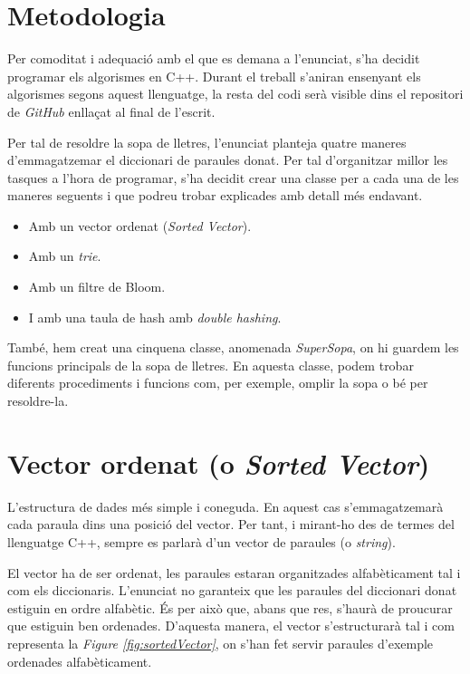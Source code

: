 \documentclass[titlepage]{article}
\begin{document}
\section{Metodologia}
Per comoditat i adequació amb el  que es demana a l'enunciat, s'ha decidit programar els algorismes en C++. Durant el treball s'aniran ensenyant els algorismes segons aquest llenguatge, la resta del codi serà visible dins el repositori de \textit{GitHub} enllaçat al final de l'escrit.\newline\par
Per tal de resoldre la sopa de lletres, l'enunciat planteja quatre maneres d'emmagatzemar el diccionari de paraules donat. Per tal d'organitzar millor les tasques a l'hora de programar, s'ha decidit crear una classe per a cada una de les maneres seguents i que podreu trobar explicades amb detall més endavant.
\begin{itemize}
  \item Amb un vector ordenat (\textit{Sorted Vector}).
  \item Amb un \textit{trie}.
  \item Amb un filtre de Bloom.
  \item I amb una taula de hash amb \textit{double hashing}.
\end{itemize}

També, hem creat una cinquena classe, anomenada \textit{SuperSopa}, on hi guardem les funcions principals de la sopa de lletres. En aquesta classe, podem trobar diferents procediments i funcions com, per exemple, omplir la sopa o bé per resoldre-la.\par

\section{Vector ordenat (o \textit{Sorted Vector})}
L'estructura de dades més simple i coneguda. En aquest cas s'emmagatzemarà cada paraula dins una posició del vector. Per tant, i mirant-ho des de termes del llenguatge C++, sempre es parlarà d'un vector de paraules (o \textit{string}).\newline\par

El vector ha de ser ordenat, les paraules estaran organitzades alfabèticament tal i com els diccionaris. L'enunciat no garanteix que les paraules del diccionari donat estiguin en ordre alfabètic. És per això que, abans que res, s'haurà de proucurar que estiguin ben ordenades. D'aquesta manera, el vector s'estructurarà tal i com representa la \textit{Figure \ref{fig:sortedVector}}, on s'han fet servir paraules d'exemple ordenades alfabèticament.
\end{document}
